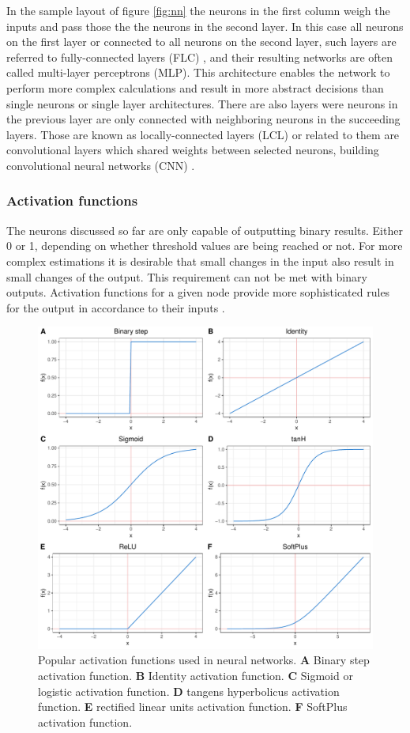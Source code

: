 In the sample layout of figure \ref{fig:nn} the neurons in the first column weigh the inputs and pass those
the the neurons in the second layer. In this case all neurons on the first layer or connected to all neurons
on the second layer, such layers are referred to fully-connected layers (FLC) , and their resulting networks
are often called multi-layer perceptrons (MLP). This architecture enables the network to perform more complex
calculations and result in more abstract decisions than single neurons or single layer architectures. There
are also layers were neurons in the previous layer are only connected with neighboring neurons in the
succeeding layers. Those are known as locally-connected layers (LCL) or related to them are convolutional
layers which shared weights between selected neurons, building convolutional neural networks (CNN) \cite{lecun1999object}.

\subsubsection{Activation functions}

The neurons discussed so far are only capable of outputting binary results. Either 0 or 1, depending on
whether threshold values are being reached or not. For more complex estimations it is desirable that small
changes in the input also result in small changes of the output. This requirement can not be met with binary
outputs. Activation functions for a given node provide more sophisticated rules for the output in accordance
to their inputs \cite{vzilinskas2006practical}.

\begin{figure}[H]
\centering
\includegraphics[height=.55\textheight, width=.85\textwidth]{Figures/activation}
\decoRule
\caption[Popular activation functions for neural networks]{Popular activation functions used in neural networks.
 \textbf{A} Binary step activation function.
 \textbf{B} Identity activation function.
 \textbf{C} Sigmoid or logistic activation function.
 \textbf{D} tangens hyperbolicus activation function.
 \textbf{E} rectified linear units activation function.
 \textbf{F} SoftPlus activation function.}
\label{fig:activation}
\end{figure}

